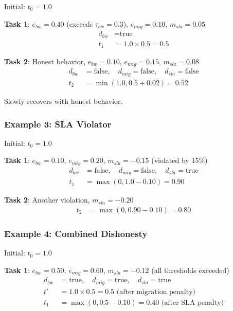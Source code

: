 \documentclass[12pt,a4paper]{article}
\begin{document}
Initial: $t_0 = 1.0$

\textbf{Task 1}: $e_{bw} = 0.40$ (exceeds $\tau_{bw} = 0.3$), $e_{mig} = 0.10$, $m_{sla} = 0.05$
\begin{align}
    d_{bw} &= \text{true} \\
    t_1 &= 1.0 \times 0.5 = 0.5
\end{align}

\textbf{Task 2}: Honest behavior, $e_{bw} = 0.10$, $e_{mig} = 0.15$, $m_{sla} = 0.08$
\begin{align}
    d_{bw} &= \text{false}, \quad d_{mig} = \text{false}, \quad d_{sla} = \text{false} \\
    t_2 &= \min(1.0, 0.5 + 0.02) = 0.52
\end{align}

Slowly recovers with honest behavior.

\subsubsection{Example 3: SLA Violator}

Initial: $t_0 = 1.0$

\textbf{Task 1}: $e_{bw} = 0.10$, $e_{mig} = 0.20$, $m_{sla} = -0.15$ (violated by 15\%)
\begin{align}
    d_{bw} &= \text{false}, \quad d_{mig} = \text{false}, \quad d_{sla} = \text{true} \\
    t_1 &= \max(0, 1.0 - 0.10) = 0.90
\end{align}

\textbf{Task 2}: Another violation, $m_{sla} = -0.20$
\begin{align}
    t_2 &= \max(0, 0.90 - 0.10) = 0.80
\end{align}

\subsubsection{Example 4: Combined Dishonesty}

Initial: $t_0 = 1.0$

\textbf{Task 1}: $e_{bw} = 0.50$, $e_{mig} = 0.60$, $m_{sla} = -0.12$ (all thresholds exceeded)
\begin{align}
    d_{bw} &= \text{true}, \quad d_{mig} = \text{true}, \quad d_{sla} = \text{true} \\
    t' &= 1.0 \times 0.5 = 0.5 \text{ (after migration penalty)} \\
    t_1 &= \max(0, 0.5 - 0.10) = 0.40 \text{ (after SLA penalty)}
\end{align}
\end{document}
